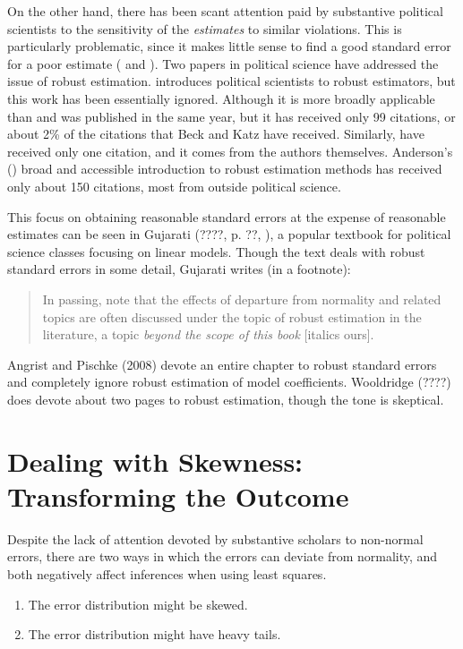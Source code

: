 \documentclass[12pt]{article}
\begin{document}
On the other hand, there has been scant attention paid by substantive political scientists to the sensitivity of the \textit{estimates} to similar violations. 
This is particularly problematic, since it makes little sense to find a good standard error for a poor estimate (\citealt{Freedman2006} and \citealt{KingRoberts2014}). 
Two papers in political science have addressed the issue of robust estimation. 
\cite{Western1995} introduces political scientists to robust estimators, but this work has been essentially ignored. 
Although it is more broadly applicable than \cite{BeckKatz1995} and was published in the same year, but it has received only 99 citations, or  about 2\% of the citations that Beck and Katz have received. 
Similarly, \cite{HardenDesmarais2011} have received only one citation, and it comes from the authors themselves.
Anderson's (\citeyear{Anderson2008}) broad and accessible introduction to robust estimation methods has received only about 150 citations, most from outside political science.

This focus on obtaining reasonable standard errors at the expense of reasonable estimates can be seen in Gujarati (????, p. ??, ), a popular textbook for political science classes focusing on linear models. 
Though the text deals with robust standard errors in some detail, Gujarati writes (in a footnote):
\begin{quote}
In passing, note that the effects of departure from normality and related topics are often discussed under the topic of robust estimation in the literature, a topic \textit{beyond the scope of this book} [italics ours].
\end{quote}
Angrist and Pischke (2008) devote an entire chapter to robust standard errors and completely ignore robust estimation of model coefficients. 
Wooldridge (????) does devote about two pages to robust estimation, though the tone is skeptical.

\section*{Dealing with Skewness: Transforming the Outcome}

Despite the lack of attention devoted by substantive scholars to non-normal errors, there are two ways in which the errors can deviate from normality, and both negatively affect inferences when using least squares. 
\begin{enumerate}
\item The error distribution might be skewed. 
\item The error distribution might have heavy tails. 
\end{enumerate}
\end{document}
